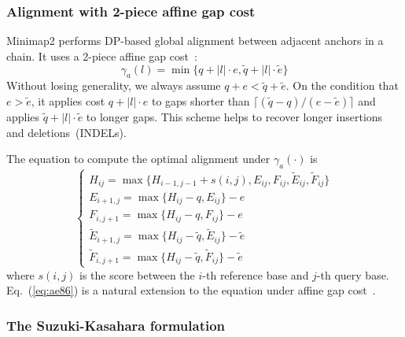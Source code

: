 \documentclass{bioinfo}
\begin{document}
\begin{methods}
\subsubsection{Alignment with 2-piece affine gap cost}

Minimap2 performs DP-based global alignment between adjacent anchors in a
chain. It uses a 2-piece affine gap cost~\citep{Gotoh:1990aa}:
\begin{equation}\label{eq:2-piece}
\gamma_a(l)=\min\{q+|l|\cdot e,\tilde{q}+|l|\cdot\tilde{e}\}
\end{equation}
Without losing generality, we always assume $q+e<\tilde{q}+\tilde{e}$.
On the condition that $e>\tilde{e}$, it applies cost $q+|l|\cdot e$ to gaps
shorter than $\lceil(\tilde{q}-q)/(e-\tilde{e})\rceil$ and applies
$\tilde{q}+|l|\cdot\tilde{e}$ to longer gaps.  This scheme helps to recover
longer insertions and deletions~(INDELs).

The equation to compute the optimal alignment under $\gamma_a(\cdot)$ is
\begin{equation}\label{eq:ae86}
\left\{\begin{array}{l}
H_{ij} = \max\{H_{i-1,j-1}+s(i,j),E_{ij},F_{ij},\tilde{E}_{ij},\tilde{F}_{ij}\}\\
E_{i+1,j}= \max\{H_{ij}-q,E_{ij}\}-e\\
F_{i,j+1}= \max\{H_{ij}-q,F_{ij}\}-e\\
\tilde{E}_{i+1,j}= \max\{H_{ij}-\tilde{q},\tilde{E}_{ij}\}-\tilde{e}\\
\tilde{F}_{i,j+1}= \max\{H_{ij}-\tilde{q},\tilde{F}_{ij}\}-\tilde{e}
\end{array}\right.
\end{equation}
where $s(i,j)$ is the score between the $i$-th reference base and $j$-th query
base. Eq.~(\ref{eq:ae86}) is a natural extension to the equation under affine
gap cost~\citep{Gotoh:1982aa,Altschul:1986aa}.

\subsubsection{The Suzuki-Kasahara formulation}


\end{methods}
\end{document}
